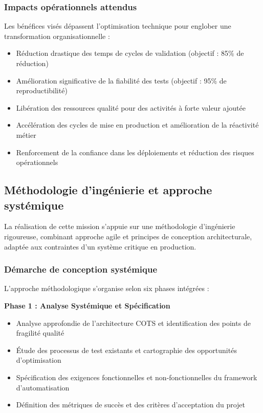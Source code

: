 \subsubsection{Impacts opérationnels attendus}

Les bénéfices visés dépassent l'optimisation technique pour englober une transformation organisationnelle :
\begin{itemize}
    \item Réduction drastique des temps de cycles de validation (objectif : 85\% de réduction)
    \item Amélioration significative de la fiabilité des tests (objectif : 95\% de reproductibilité)
    \item Libération des ressources qualité pour des activités à forte valeur ajoutée
    \item Accélération des cycles de mise en production et amélioration de la réactivité métier
    \item Renforcement de la confiance dans les déploiements et réduction des risques opérationnels
\end{itemize}

\subsection{Méthodologie d'ingénierie et approche systémique}

La réalisation de cette mission s'appuie sur une méthodologie d'ingénierie rigoureuse, combinant approche agile et principes de conception architecturale, adaptée aux contraintes d'un système critique en production.

\subsubsection{Démarche de conception systémique}

L'approche méthodologique s'organise selon six phases intégrées :

\textbf{Phase 1 : Analyse Systémique et Spécification}
\begin{itemize}
    \item Analyse approfondie de l'architecture COTS et identification des points de fragilité qualité
    \item Étude des processus de test existants et cartographie des opportunités d'optimisation
    \item Spécification des exigences fonctionnelles et non-fonctionnelles du framework d'automatisation
    \item Définition des métriques de succès et des critères d'acceptation du projet
\end{itemize}

